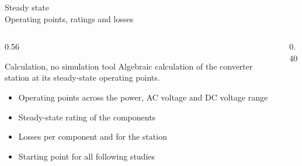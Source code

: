 \begin{frame}{Design process\\System studies}
  \vspace{0.6em}

  \centering
  }
\end{frame}

\begin{frame}{Steady state\\Operating points, ratings and losses}
  \begin{columns}[T,onlytextwidth]
    \begin{column}{0.56\textwidth}
      \begin{block}{Calculation, no simulation tool}
        Algebraic calculation of the converter station at its steady-state operating points.
      \end{block}
      \begin{itemize}
        \setlength{\itemsep}{0.4em}
        \item Operating points across the power, AC voltage and DC voltage range
        \item Steady-state rating of the components
        \item Losses per component and for the station
        \item Starting point for all following studies
      \end{itemize}
    \end{column}
    \begin{column}{0.40\textwidth}
    \end{column}
  \end{columns}
\end{frame}

